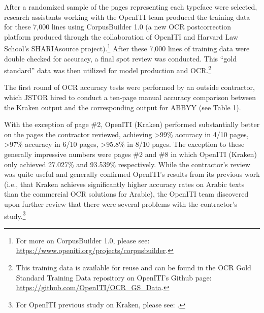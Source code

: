 After a randomized sample of the pages representing each typeface were
selected, research assistants working with the OpenITI team produced the
training data for these 7,000 lines using CorpusBuilder 1.0 (a new OCR
postcorrection platform produced through the collaboration of OpenITI and
Harvard Law School’s SHARIAsource project).\footnote{For more on CorpusBuilder
1.0, please see: \url{https://www.openiti.org/projects/corpusbuilder}.} After
these 7,000 lines of training data were double checked for accuracy, a final
spot review was conducted. This “gold standard” data was then utilized for
model production and OCR.\footnote{This training data is available for reuse
and can be found in the OCR Gold Standard Training Data repository on OpenITI’s
Github page: \url{https://github.com/OpenITI/OCR_GS_Data}.}


The first round of OCR accuracy tests were performed by an outside contractor,
which JSTOR hired to conduct a ten-page manual accuracy comparison between the
Kraken output and the corresponding output for ABBYY (see Table 1).

	 
With the exception of page \#2, OpenITI (Kraken) performed substantially better
on the pages the contractor reviewed, achieving >99\% accuracy in 4/10 pages,
>97\% accuracy in 6/10 pages, >95.8\% in 8/10 pages. The exception to these
generally impressive numbers were pages \#2 and \#8 in which OpenITI (Kraken)
only achieved 27.027\% and 93.539\% respectively. While the contractor’s review
was quite useful and generally confirmed OpenITI’s results from its previous
work (i.e., that Kraken achieves significantly higher accuracy rates on Arabic
texts than the commercial OCR solutions for Arabic), the OpenITI team
discovered upon further review that there were several problems with the
contractor’s study.\footnote{For OpenITI previous study on Kraken, please see:
\cite{kiessling2017important}.}

